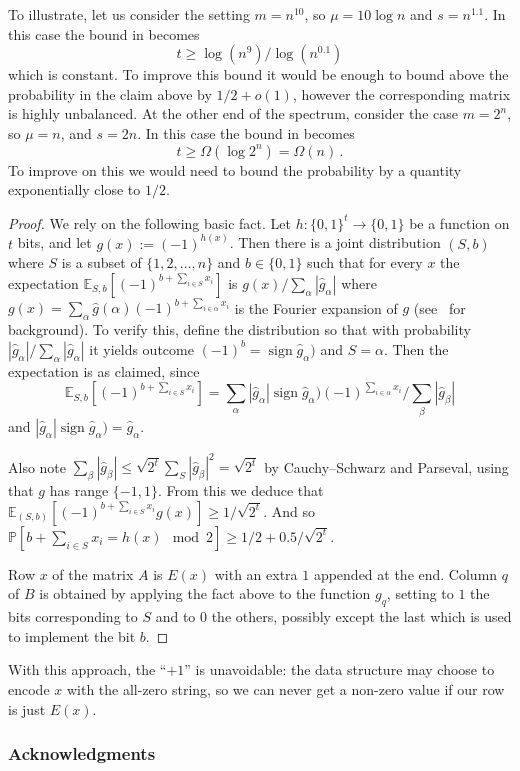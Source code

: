 \documentclass{toc}
\DeclareMathOperator{\sign}{\mathrm{sign}}  %
\newcommand{\zo}{\{0, 1\}}
\renewcommand{\P}{\mathbb{P}}
\newcommand{\E}{\mathbb{E}}
\renewcommand{\a}{\alpha}
\renewcommand{\b}{\beta}
\begin{document}
To illustrate, let us consider the setting $m=n^{10}$, so $\mu=10\log n$
and $s=n^{1.1}$. In this case the bound in 
becomes
\[
t\ge\log(n^{9})/\log(n^{0.1})
\]
which is constant. To improve this bound it would be enough to bound
above the probability in the claim above by $1/2+o(1)$, however the
corresponding matrix is highly unbalanced. At the other end of the
spectrum, consider the case $m=2^{n}$, so $\mu=n$, and $s=2n$.
In this case the bound in  becomes
\[
t\ge\Omega(\log2^{n})=\Omega(n)\,.
\]
To improve on this we would need to bound the probability by a quantity
exponentially close to $1/2$.
\begin{proof}
We rely on the following basic fact. Let $h:\zo^{t}\to\{0,1\}$ be
a function on $t$ bits, and let $g(x):=(-1)^{h(x)}$. Then there
is a joint distribution $(S,b)$ where $S$ is a subset of $\{1,2,\ldots,n\}$
and $b\in\{0,1\}$ such that for every $x$ the expectation $\E_{S,b}[(-1)^{b+\sum_{i\in S}x_{i}}]$
is $g(x)/\sum_{\a}|\hat{g}_{\a}|$ where $g(x)=\sum_{\alpha}\hat{g}(\alpha)(-1)^{b+\sum_{i\in\a}x_{i}}$
is the Fourier expansion of $g$ (see~\cite{ODonnell14} for background).
To verify this, define the distribution so that with probability $|\hat{g}_{\a}|/\sum_{\a}|\hat{g}_{\a}|$
it yields outcome $(-1)^{b}=\sign\hat{g}_{\a})$ and $S=\a$. Then
the expectation is as claimed, since
\[
\E_{S,b}[(-1)^{b+\sum_{i\in S}x_{i}}]=
%
%
\sum_{\a}|\hat{g}_{\a}|\sign\hat{g}_{\a})(-1)^{\sum_{i\in\a}x_{i}}\Big/\sum_{\b}|\hat{g}_{\b}| %
\]
and $|\hat{g}_{\a}|\sign\hat{g}_{\a})=\hat{g}_{\a}$.

Also note $\sum_{\b}|\hat{g}_{\b}|\le\sqrt{2^{t}}\sum_{S}|\hat{g}_{\b}|^{2}=\sqrt{2^{t}}$
by Cauchy--Schwarz and Parseval, using that $g$ has range $\{-1,1\}$.
From this we deduce that $\E_{(S,b)}[(-1)^{b+\sum_{i\in S}x_{i}}g(x)]\ge1/\sqrt{2^{t}}$.
And so $\P[b+\sum_{i\in S}x_{i}=h(x)\mod2]\ge1/2+0.5/\sqrt{2^{t}}$.

Row $x$ of the matrix $A$ is $E(x)$ with an extra $1$ appended
at the end. Column $q$ of $B$ is obtained by applying the fact above
to the function $g_{q}$, setting to $1$ the bits corresponding to
$S$ and to $0$ the others, possibly except the last which is used
to implement the bit $b$.
\end{proof}
With this approach, the ``$+1$'' is unavoidable: the data structure
may choose to encode $x$ with the all-zero string, so we can never
get a non-zero value if our row is just $E(x)$.

%
\subsubsection*{Acknowledgments}   %
\end{document}
